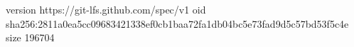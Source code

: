 version https://git-lfs.github.com/spec/v1
oid sha256:2811a0ea5cc09683421338ef0cb1baa72fa1db04bc5e73fad9d5c57bd53f5c4e
size 196704
